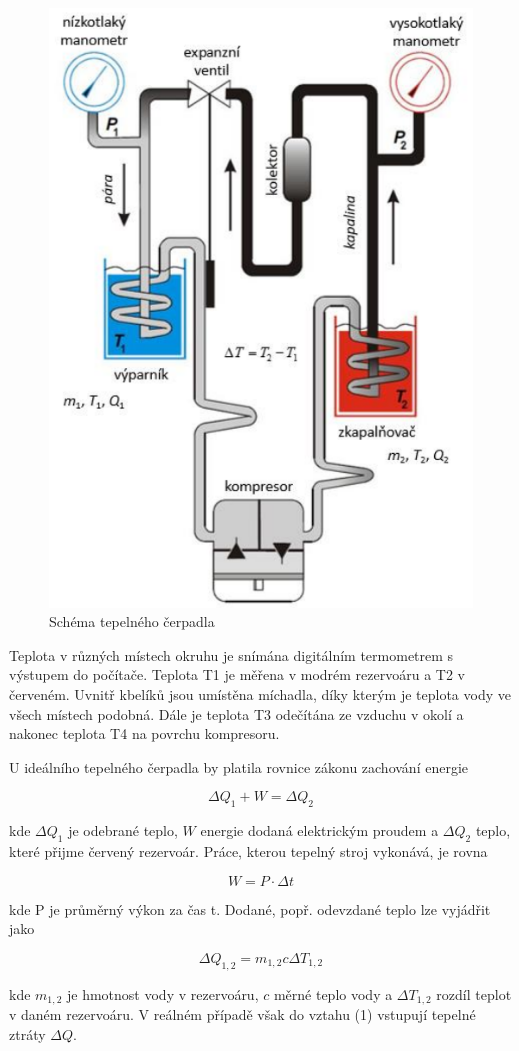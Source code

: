 \begin{figure}[h]
    \centering
    \includegraphics[width=0.4\linewidth]{27 - Tepelné čerpadlo//Protokol_tepelné čerpadlo//img/Schéma tepelného čerpadla.png}
    \caption{Schéma tepelného čerpadla}
    \label{fig:tepelne-cerpadlo}
\end{figure}

\newpage

Teplota v různých místech okruhu je snímána digitálním termometrem s výstupem do počítače. Teplota T1 je měřena v modrém rezervoáru a T2 v červeném. Uvnitř kbelíků jsou umístěna míchadla, díky kterým je teplota vody ve všech místech podobná. Dále je teplota T3 odečítána ze vzduchu v okolí a nakonec teplota T4 na povrchu kompresoru.

U ideálního tepelného čerpadla by platila rovnice zákonu zachování energie

\begin{equation}
    \Delta Q_1 + W = \Delta Q_2
\end{equation}

kde \(\Delta Q_1\) je odebrané teplo, \(W\) energie dodaná elektrickým proudem a \(\Delta Q_2\) teplo, které přijme červený rezervoár. Práce, kterou tepelný stroj vykonává, je rovna

\begin{equation}
    W = P \cdot \Delta t
\end{equation}

kde P je průměrný výkon za čas t. Dodané, popř. odevzdané teplo lze vyjádřit jako

\begin{equation}
    \Delta Q_{1,2} = m_{1,2} c \Delta T_{1,2}
\end{equation}

kde \(m_{1,2}\) je hmotnost vody v rezervoáru, \(c\) měrné teplo vody a \(\Delta T_{1,2}\) rozdíl teplot v daném rezervoáru. V reálném případě však do vztahu (1) vstupují tepelné ztráty \(\Delta Q\).

